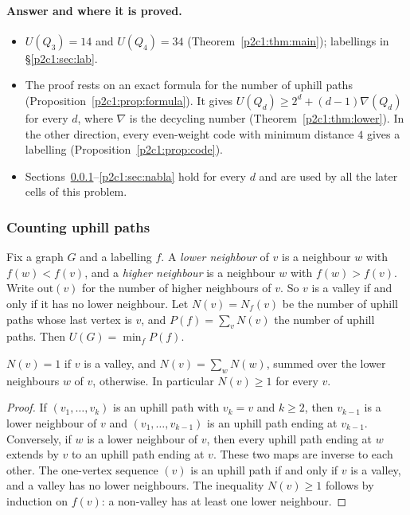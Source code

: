 \paragraph{Answer and where it is proved.}
\begin{itemize}
\item $U(Q_3)=14$ and $U(Q_4)=34$ (Theorem~\ref{p2c1:thm:main}); labellings in
  \S\ref{p2c1:sec:lab}.
\item The proof rests on an exact formula for the number of uphill paths
  (Proposition~\ref{p2c1:prop:formula}). It gives $U(Q_d)\ge 2^d+(d-1)\nabla(Q_d)$ for every $d$,
  where $\nabla$ is the decycling number (Theorem~\ref{p2c1:thm:lower}). In the other direction,
  every even-weight code with minimum distance $4$ gives a labelling
  (Proposition~\ref{p2c1:prop:code}).
\item Sections~\ref{p2c1:sec:count}--\ref{p2c1:sec:nabla} hold for every $d$ and are used by all
  the later cells of this problem.
\end{itemize}

\subsubsection{Counting uphill paths}\label{p2c1:sec:count}

Fix a graph $G$ and a labelling $f$. A \emph{lower neighbour} of $v$ is a neighbour $w$ with
$f(w)<f(v)$, and a \emph{higher neighbour} is a neighbour $w$ with $f(w)>f(v)$. Write $\mathrm{out}(v)$ for the number of
higher neighbours of $v$. So $v$ is a valley if and only if it has no lower neighbour. Let
$N(v)=N_f(v)$ be the number of uphill paths whose last vertex is $v$, and $P(f)=\sum_vN(v)$ the
number of uphill paths. Then $U(G)=\min_fP(f)$.

\begin{lemma}[Recursion]\label{p2c1:lem:rec}
$N(v)=1$ if $v$ is a valley, and $N(v)=\sum_{w}N(w)$, summed over the lower neighbours $w$ of $v$,
otherwise. In particular $N(v)\ge1$ for every $v$.
\end{lemma}

\begin{proof}
If $(v_1,\dots,v_k)$ is an uphill path with $v_k=v$ and $k\ge2$, then $v_{k-1}$ is a lower
neighbour of $v$ and $(v_1,\dots,v_{k-1})$ is an uphill path ending at $v_{k-1}$. Conversely, if
$w$ is a lower neighbour of $v$, then every uphill path ending at $w$ extends by $v$ to an uphill
path ending at $v$. These two maps are inverse to each other. The one-vertex sequence $(v)$ is an
uphill path if and only if $v$ is a valley, and a valley has no lower neighbours. The inequality
$N(v)\ge1$ follows by induction on $f(v)$: a non-valley has at least one lower neighbour.
\end{proof}

